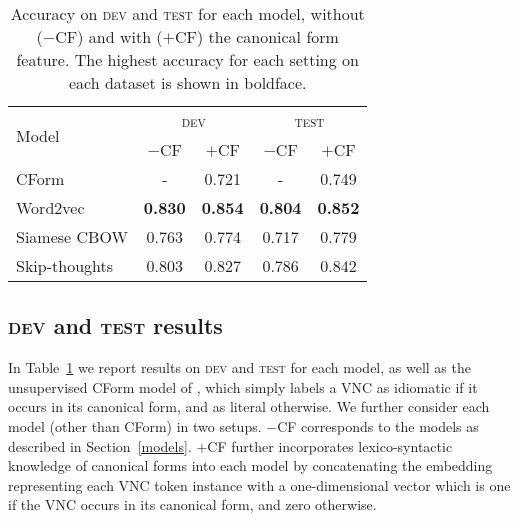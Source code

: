\documentclass[11pt,a4paper]{article}
\newcommand{\secref}[1]{Section~\ref{#1}}
\newcommand{\tabref}[1]{Table~\ref{#1}}
\newcommand{\dev}{\textsc{dev}\xspace}
\newcommand{\test}{\textsc{test}\xspace}
\begin{document}
\begin{table}
\setlength{\tabcolsep}{0.4em}
\begin{center}
\begin{tabular}{l|cc|cc}
\multirow{2}{*}{Model}  &  \multicolumn{2}{c}{\dev}  &  \multicolumn{2}{c}{\test}\\
\cline{2-5}
& $-$CF & $+$CF & $-$CF & $+$CF\\
\hline
CForm & - & 0.721 & - & 0.749\\
Word2vec &\textbf{0.830} &\textbf{0.854}& \textbf{0.804} &\textbf{0.852}\\
Siamese CBOW &0.763 &0.774 & 0.717 &0.779\\
Skip-thoughts &0.803 &0.827& 0.786 &0.842\\
\end{tabular}
\caption{Accuracy on \dev and \test for each model, without ($-$CF)
  and with ($+$CF) the canonical form feature. The highest accuracy
  for each setting on each dataset is shown in
  boldface. \label{results}}
\end{center}
\end{table}







\subsection{\dev and \test results}


In \tabref{results} we report results on \dev and \test for each
model,
as well as the unsupervised CForm model of ,
which simply labels a VNC as idiomatic if it occurs in its canonical
form, and as literal otherwise. We further consider each model (other
than CForm) in two setups.  $-$CF corresponds to the models as
described in \secref{models}. $+$CF further incorporates
lexico-syntactic knowledge of canonical forms into each model by
concatenating the embedding representing each VNC token instance with
a one-dimensional vector which is one if the VNC occurs in its
canonical form, and zero otherwise.
\end{document}
